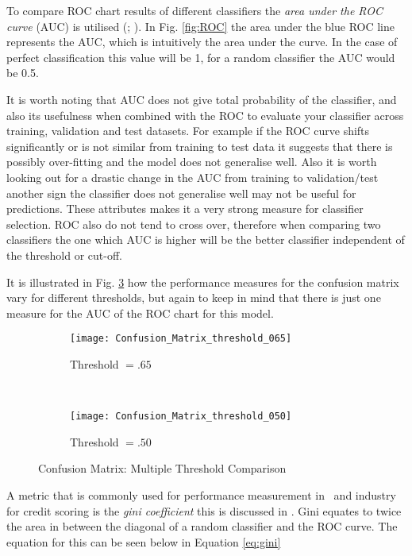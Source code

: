 To compare ROC chart results of different classifiers the \textit{area under the ROC curve} (AUC) is utilised (\cite{bradley_use_1997}; \cite{hanley_meaning_1982}). In Fig. \ref{fig:ROC} the area under the blue ROC line represents the AUC, which is intuitively the area under the curve. In the case of perfect classification this value will be 1, for a random classifier the AUC would be 0.5. 

It is worth noting that AUC does not give total probability of the classifier, and also its usefulness when combined with the ROC to evaluate your classifier across training, validation and test datasets. For example if the ROC curve shifts significantly or is not similar from training to test data it suggests that there is possibly over-fitting and the model does not generalise well. Also it is worth looking out for a drastic change in the AUC from training to validation/test another sign the classifier does not generalise well may not be useful for predictions. These attributes makes it a very strong measure for classifier selection. ROC also do not tend to cross over, therefore when comparing two classifiers the one which AUC is higher will be the better classifier independent of the threshold or cut-off.

It is illustrated in Fig. \ref{fig:matric_compare} how the performance measures for the confusion matrix vary for different thresholds, but again to keep in mind that there is just one measure for the AUC of the ROC chart for this model.

\begin{figure}[H]
	\centering
	\begin{subfigure}[b]{0.45\textwidth}
		\captionsetup{font=scriptsize}
		\texttt{[image: Confusion\_Matrix\_threshold\_065]}
		\caption{Threshold $=.65$}\label{fig:Threshold65}
	\end{subfigure} ~\quad
	\begin{subfigure}[b]{0.45\textwidth}
		\captionsetup{font=scriptsize}
		\texttt{[image: Confusion\_Matrix\_threshold\_050]}
		\caption{Threshold $=.50$}\label{fig:Threshold50}
	\end{subfigure}
	\caption{Confusion Matrix: Multiple Threshold Comparison}
	\label{fig:matric_compare}
\end{figure}

A metric that is commonly used for performance measurement in \subjectname\ and industry for credit scoring is the \textit{gini coefficient} this is discussed in \citep{hand_good_2005}. Gini equates to twice the area in between the diagonal of a random classifier and the ROC curve. The equation for this can be seen below in Equation \ref{eq:gini}

